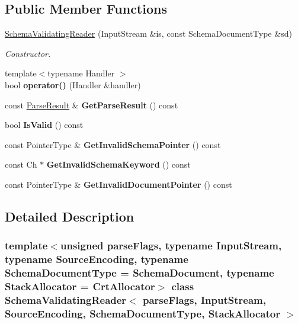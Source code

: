 \subsection*{Public Member Functions}
\begin{DoxyCompactItemize}
\item 
\hyperlink{a02412_ae7945b71687ad3dd13b9c3d096892eac}{Schema\+Validating\+Reader} (Input\+Stream \&is, const Schema\+Document\+Type \&sd)
\begin{DoxyCompactList}\small\item\em Constructor. \end{DoxyCompactList}\item 
\mbox{\label{a02412_a7135d8d53aacd850fbce2901cca4a4c3}} 
{\footnotesize template$<$typename Handler $>$ }\\bool {\bfseries operator()} (Handler \&handler)
\item 
\mbox{\label{a02412_add1def2be62e1443a88c7792e5b34e3b}} 
const \hyperlink{a02188}{Parse\+Result} \& {\bfseries Get\+Parse\+Result} () const
\item 
\mbox{\label{a02412_a3c04fa90a430a67a993a2b8876e89ff4}} 
bool {\bfseries Is\+Valid} () const
\item 
\mbox{\label{a02412_a9accbbcbe9afbbe26300d943ccb46362}} 
const Pointer\+Type \& {\bfseries Get\+Invalid\+Schema\+Pointer} () const
\item 
\mbox{\label{a02412_ac3192b08923b4d68d04462b0b61ded1c}} 
const Ch $\ast$ {\bfseries Get\+Invalid\+Schema\+Keyword} () const
\item 
\mbox{\label{a02412_a53051bfc38cb24368fc40e4334102da8}} 
const Pointer\+Type \& {\bfseries Get\+Invalid\+Document\+Pointer} () const
\end{DoxyCompactItemize}


\subsection{Detailed Description}
\subsubsection*{template$<$unsigned parse\+Flags, typename Input\+Stream, typename Source\+Encoding, typename Schema\+Document\+Type = Schema\+Document, typename Stack\+Allocator = Crt\+Allocator$>$\newline
class Schema\+Validating\+Reader$<$ parse\+Flags, Input\+Stream, Source\+Encoding, Schema\+Document\+Type, Stack\+Allocator $>$}

